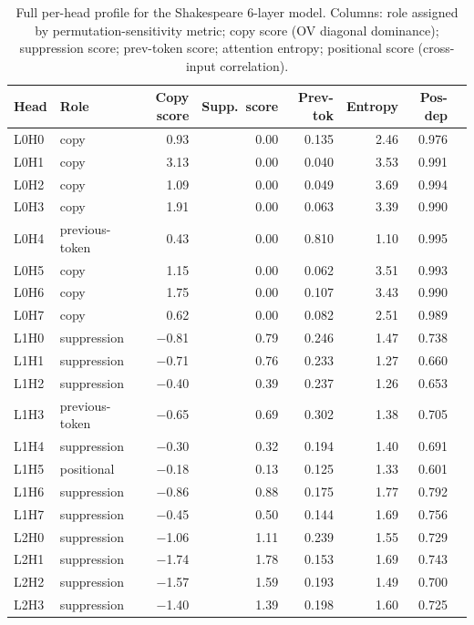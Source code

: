 \begin{table}[h]
\centering
\caption{Full per-head profile for the Shakespeare 6-layer model. Columns: role assigned
by permutation-sensitivity metric; copy score (OV diagonal dominance); suppression score;
prev-token score; attention entropy; positional score (cross-input correlation).}
\label{tab:shakespeare_all_heads}
\tiny
\begin{tabular}{llrrrrrr}
\toprule
Head & Role & Copy score & Supp.\ score & Prev-tok & Entropy & Pos-dep \\
\midrule
L0H0 & copy          &  0.93 & 0.00 & 0.135 & 2.46 & 0.976 \\
L0H1 & copy          &  3.13 & 0.00 & 0.040 & 3.53 & 0.991 \\
L0H2 & copy          &  1.09 & 0.00 & 0.049 & 3.69 & 0.994 \\
L0H3 & copy          &  1.91 & 0.00 & 0.063 & 3.39 & 0.990 \\
L0H4 & previous-token &  0.43 & 0.00 & 0.810 & 1.10 & 0.995 \\
L0H5 & copy          &  1.15 & 0.00 & 0.062 & 3.51 & 0.993 \\
L0H6 & copy          &  1.75 & 0.00 & 0.107 & 3.43 & 0.990 \\
L0H7 & copy          &  0.62 & 0.00 & 0.082 & 2.51 & 0.989 \\
\midrule
L1H0 & suppression   & $-$0.81 & 0.79 & 0.246 & 1.47 & 0.738 \\
L1H1 & suppression   & $-$0.71 & 0.76 & 0.233 & 1.27 & 0.660 \\
L1H2 & suppression   & $-$0.40 & 0.39 & 0.237 & 1.26 & 0.653 \\
L1H3 & previous-token & $-$0.65 & 0.69 & 0.302 & 1.38 & 0.705 \\
L1H4 & suppression   & $-$0.30 & 0.32 & 0.194 & 1.40 & 0.691 \\
L1H5 & positional    & $-$0.18 & 0.13 & 0.125 & 1.33 & 0.601 \\
L1H6 & suppression   & $-$0.86 & 0.88 & 0.175 & 1.77 & 0.792 \\
L1H7 & suppression   & $-$0.45 & 0.50 & 0.144 & 1.69 & 0.756 \\
\midrule
L2H0 & suppression   & $-$1.06 & 1.11 & 0.239 & 1.55 & 0.729 \\
L2H1 & suppression   & $-$1.74 & 1.78 & 0.153 & 1.69 & 0.743 \\
L2H2 & suppression   & $-$1.57 & 1.59 & 0.193 & 1.49 & 0.700 \\
L2H3 & suppression   & $-$1.40 & 1.39 & 0.198 & 1.60 & 0.725 \\

\end{tabular}
\end{table}
